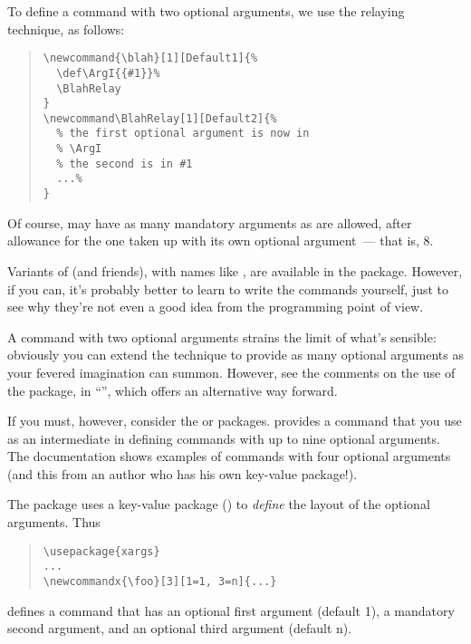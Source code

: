 To define a command with two optional arguments, we use the relaying
technique, as follows:
\begin{quote}
\begin{verbatim}
\newcommand{\blah}[1][Default1]{%
  \def\ArgI{{#1}}%
  \BlahRelay
}
\newcommand\BlahRelay[1][Default2]{%
  % the first optional argument is now in
  % \ArgI
  % the second is in #1
  ...%
}
\end{verbatim}
\end{quote}
Of course,  may have as many mandatory arguments as are
allowed, after allowance for the one taken up with its own
optional argument~--- that is, 8.

Variants of  (and friends), with names like
, are available in the  package.
However, if you can, it's probably better to learn to write the commands
yourself, just to see why they're not even a good idea from the
programming point of view.

A command with two optional arguments strains the limit of what's
sensible: obviously you can extend the technique to provide as many
optional arguments as your fevered imagination can summon.  However,
see the comments on the use of the  package, in 
``'',
which offers an alternative way forward.

If you must, however, consider the  or
 packages.  
provides a  command that you use as an intermediate in
defining commands with up to nine optional arguments.  The
documentation shows examples of commands with four optional arguments
(and this from an author who has his own key-value package!).

The  package uses a key-value package
() to \emph{define} the layout of the optional
arguments.  Thus
\begin{quote}
\begin{verbatim}
\usepackage{xargs}
...
\newcommandx{\foo}[3][1=1, 3=n]{...}
\end{verbatim}
\end{quote}
defines a command  that has an optional first argument
(default 1), a mandatory second argument, and an optional third
argument (default n).

